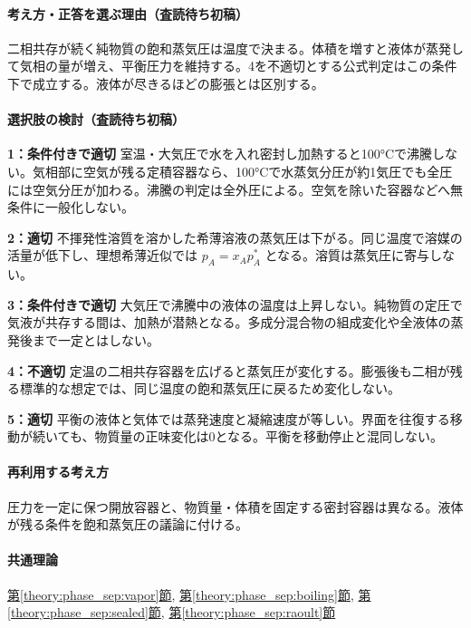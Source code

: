\paragraph{考え方・正答を選ぶ理由（査読待ち初稿）} 二相共存が続く純物質の飽和蒸気圧は温度で決まる。体積を増すと液体が蒸発して気相の量が増え、平衡圧力を維持する。4を不適切とする公式判定はこの条件下で成立する。液体が尽きるほどの膨張とは区別する。

\paragraph{選択肢の検討（査読待ち初稿）}\mbox{}\par

\noindent\textbf{1：条件付きで適切} 室温・大気圧で水を入れ密封し加熱すると100°Cで沸騰しない。気相部に空気が残る定積容器なら、100°Cで水蒸気分圧が約1気圧でも全圧には空気分圧が加わる。沸騰の判定は全外圧による。空気を除いた容器などへ無条件に一般化しない。\par

\noindent\textbf{2：適切} 不揮発性溶質を溶かした希薄溶液の蒸気圧は下がる。同じ温度で溶媒の活量が低下し、理想希薄近似では \(p_A=x_Ap_A^*\) となる。溶質は蒸気圧に寄与しない。\par

\noindent\textbf{3：条件付きで適切} 大気圧で沸騰中の液体の温度は上昇しない。純物質の定圧で気液が共存する間は、加熱が潜熱となる。多成分混合物の組成変化や全液体の蒸発後まで一定とはしない。\par

\noindent\textbf{4：不適切} 定温の二相共存容器を広げると蒸気圧が変化する。膨張後も二相が残る標準的な想定では、同じ温度の飽和蒸気圧に戻るため変化しない。\par

\noindent\textbf{5：適切} 平衡の液体と気体では蒸発速度と凝縮速度が等しい。界面を往復する移動が続いても、物質量の正味変化は0となる。平衡を移動停止と混同しない。\par

\paragraph{再利用する考え方} 圧力を一定に保つ開放容器と、物質量・体積を固定する密封容器は異なる。液体が残る条件を飽和蒸気圧の議論に付ける。

\paragraph{共通理論} \hyperref[theory:phase_sep:vapor]{第\ref*{theory:phase_sep:vapor}節}, \hyperref[theory:phase_sep:boiling]{第\ref*{theory:phase_sep:boiling}節}, \hyperref[theory:phase_sep:sealed]{第\ref*{theory:phase_sep:sealed}節}, \hyperref[theory:phase_sep:raoult]{第\ref*{theory:phase_sep:raoult}節}

